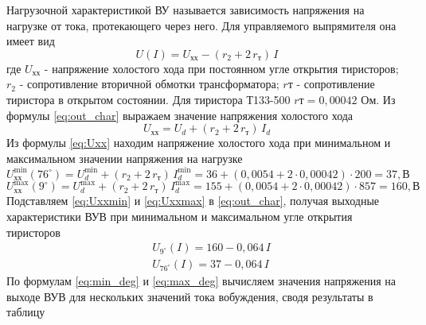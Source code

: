 Нагрузочной характеристикой ВУ называется зависимость напряжения на нагрузке от тока, протекающего через него. Для управляемого выпрямителя она имеет вид
\begin{equation}
 \label{eq:out_char}
 U(I) = U_{\text{хх}} - (r_2 + 2 \, r_{\text{т}}) \, I
\end{equation}
где $U_{\text{хх}}$ - напряжение холостого хода при постоянном угле открытия тиристоров; $r_2$ - сопротивление вторичной обмотки трансформатора; $r{\text{т}}$ - сопротивление тиристора в открытом состоянии. Для тиристора Т133-500 $r{\text{т}} = 0,00042$ Ом. Из формулы \eqref{eq:out_char} выражаем значение напряжения холостого хода
\begin{equation}
 \label{eq:Uxx}
 U_{\text{хх}} = U_d + (r_2 + 2 \, r_{\text{т}}) \, I_d
\end{equation}
Из формулы \eqref{eq:Uxx} находим напряжение холостого хода при минимальном и максимальном значении напряжения на нагрузке
\begin{equation}
\label{eq:Uxxmin}
 U_{\text{хх}}^{\min}(76^{\circ}) = U_d^{\min} + (r_2 + 2 \, r_{\text{т}}) \, I_d^{\min} = 36 + (0,0054 + 2 \cdot 0,00042) \cdot 200 = 37, \text{В}
\end{equation}
\begin{equation}
\label{eq:Uxxmax}
 U_{\text{хх}}^{\max}(9^{\circ}) = U_d^{\max} + (r_2 + 2 \, r_{\text{т}}) \, I_d^{\max} = 155 + (0,0054 + 2 \cdot 0,00042) \cdot 857 = 160, \text{В}
\end{equation}
Подставляем \eqref{eq:Uxxmin} и \eqref{eq:Uxxmax} в \eqref{eq:out_char}, получая выходные характеристики ВУВ при минимальном и максимальном угле открытия тиристоров
\begin{align}
 \label{eq:min_deg}
 & U_{9^{\circ}}(I) = 160 - 0,064 \, I \\
 \label{eq:max_deg}
 & U_{76^{\circ}}(I) = 37 - 0,064 \, I 
\end{align}
По формулам \eqref{eq:min_deg} и \eqref{eq:max_deg} вычисляем  значения напряжения на выходе ВУВ для нескольких значений тока вобуждения, сводя результаты в таблицу 











